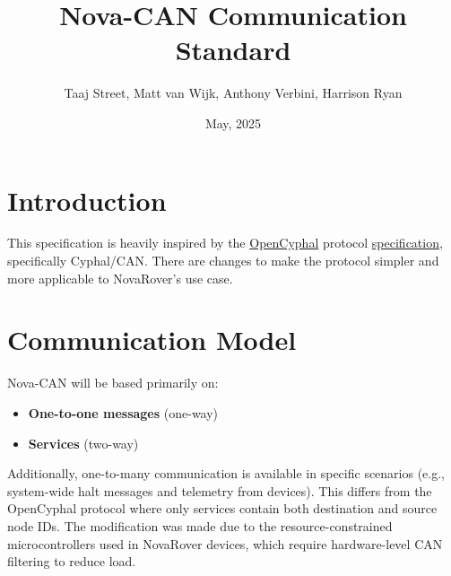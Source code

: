 \documentclass[a4paper,12pt]{article}
\title{Nova-CAN Communication Standard}
\author{Taaj Street, Matt van Wijk, Anthony Verbini, Harrison Ryan}
\date{May, 2025}
\begin{document}
\maketitle
\tableofcontents
\newpage

\section{Introduction}
This specification is heavily inspired by the \href{https://opencyphal.org/}{OpenCyphal} protocol \href{https://opencyphal.org/specification/Cyphal_Specification.pdf}{specification}, specifically Cyphal/CAN. There are changes to make the protocol simpler and more applicable to NovaRover's use case.

\section{Communication Model}
Nova-CAN will be based primarily on:
\begin{itemize}
    \item \textbf{One-to-one messages} (one-way)
    \item \textbf{Services} (two-way)
\end{itemize}

Additionally, one-to-many communication is available in specific scenarios (e.g., system-wide halt messages and telemetry from devices). This differs from the OpenCyphal protocol where only services contain both destination and source node IDs. The modification was made due to the resource-constrained microcontrollers used in NovaRover devices, which require hardware-level CAN filtering to reduce load.
\end{document}
